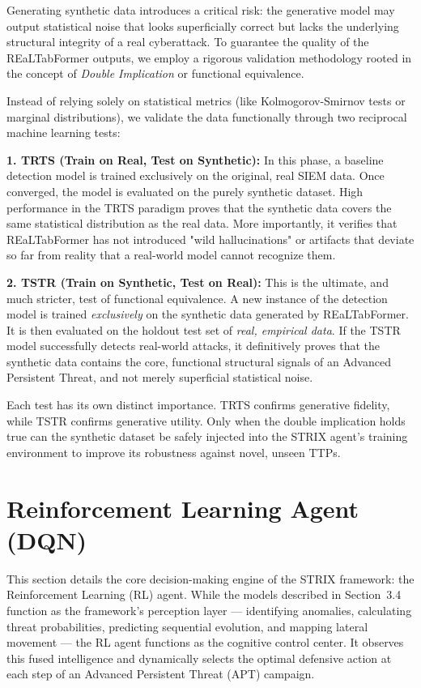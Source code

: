Generating synthetic data introduces a critical risk: the generative model may output statistical noise that looks superficially correct but lacks the underlying structural integrity of a real cyberattack. To guarantee the quality of the REaLTabFormer outputs, we employ a rigorous validation methodology rooted in the concept of \textit{Double Implication} or functional equivalence. 

Instead of relying solely on statistical metrics (like Kolmogorov-Smirnov tests or marginal distributions), we validate the data functionally through two reciprocal machine learning tests:

\textbf{1. TRTS (Train on Real, Test on Synthetic):}
In this phase, a baseline detection model is trained exclusively on the original, real SIEM data. Once converged, the model is evaluated on the purely synthetic dataset. High performance in the TRTS paradigm proves that the synthetic data covers the same statistical distribution as the real data. More importantly, it verifies that REaLTabFormer has not introduced "wild hallucinations" or artifacts that deviate so far from reality that a real-world model cannot recognize them.

\textbf{2. TSTR (Train on Synthetic, Test on Real):}
This is the ultimate, and much stricter, test of functional equivalence. A new instance of the detection model is trained \textit{exclusively} on the synthetic data generated by REaLTabFormer. It is then evaluated on the holdout test set of \textit{real, empirical data}. If the TSTR model successfully detects real-world attacks, it definitively proves that the synthetic data contains the core, functional structural signals of an Advanced Persistent Threat, and not merely superficial statistical noise. 

Each test has its own distinct importance. TRTS confirms generative fidelity, while TSTR confirms generative utility. Only when the double implication holds true can the synthetic dataset be safely injected into the STRIX agent's training environment to improve its robustness against novel, unseen TTPs.



\section{Reinforcement Learning Agent (DQN)}
\label{sec:rl-agent}

This section details the core decision-making engine of the STRIX framework: the Reinforcement Learning (RL) agent. While the models described in Section~3.4 function as the framework's perception layer --- identifying anomalies, calculating threat probabilities, predicting sequential evolution, and mapping lateral movement --- the RL agent functions as the cognitive control center. It observes this fused intelligence and dynamically selects the optimal defensive action at each step of an Advanced Persistent Threat (APT) campaign.

